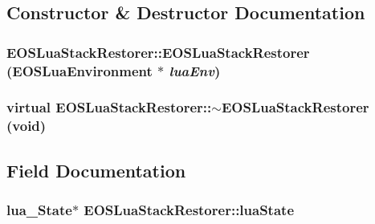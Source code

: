 \subsection{Constructor \& Destructor Documentation}
\hypertarget{classEOSLuaStackRestorer_e3649dbb621699f8819b90a92cf99a9c}{
\subsubsection[{EOSLuaStackRestorer}]{\setlength{\rightskip}{0pt plus 5cm}EOSLuaStackRestorer::EOSLuaStackRestorer ({\bf EOSLuaEnvironment} $\ast$ {\em luaEnv})}}
\label{classEOSLuaStackRestorer_e3649dbb621699f8819b90a92cf99a9c}


\hypertarget{classEOSLuaStackRestorer_f884b6fb3dc476c864a541feec1a4450}{
\subsubsection[{$\sim$EOSLuaStackRestorer}]{\setlength{\rightskip}{0pt plus 5cm}virtual EOSLuaStackRestorer::$\sim$EOSLuaStackRestorer (void)}}
\label{classEOSLuaStackRestorer_f884b6fb3dc476c864a541feec1a4450}




\subsection{Field Documentation}
\hypertarget{classEOSLuaStackRestorer_64d91d3f95091c585218086be99a2e9e}{
\subsubsection[{luaState}]{\setlength{\rightskip}{0pt plus 5cm}lua\_\-State$\ast$ {\bf EOSLuaStackRestorer::luaState}}}
\label{classEOSLuaStackRestorer_64d91d3f95091c585218086be99a2e9e}


